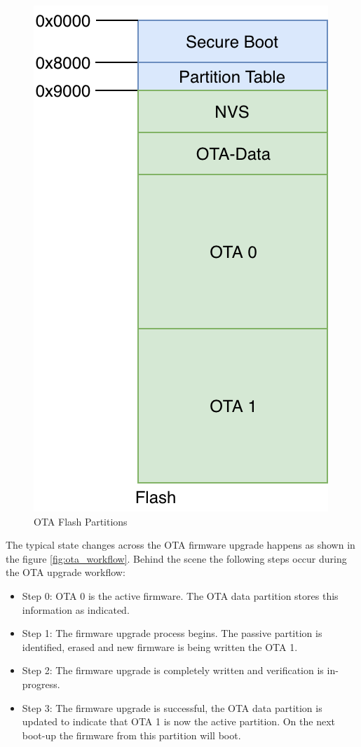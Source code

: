 \documentclass[main.tex]{subfiles}
\begin{document}
\begin{figure}[h!]
    \centering
    \includegraphics[scale=0.4]{../../_static/flash_partitions_upgrade.png}
    \caption{OTA Flash Partitions}
    \label{fig:ota_flash_parts}
\end{figure}

The typical state changes across the OTA firmware upgrade happens as shown in the figure \ref{fig:ota_workflow}. Behind the scene the following steps occur during the OTA upgrade workflow:
\begin{itemize}
    \item Step 0: OTA 0 is the active firmware. The OTA data partition stores this information as indicated.
    \item Step 1: The firmware upgrade process begins. The passive partition is identified, erased and new firmware is being written the OTA 1.
    \item Step 2: The firmware upgrade is completely written and verification is in-progress.
    \item Step 3: The firmware upgrade is successful, the OTA data partition is updated to indicate that OTA 1 is now the active partition. On the next boot-up the firmware from this partition will boot.
\end{itemize}
\end{document}
